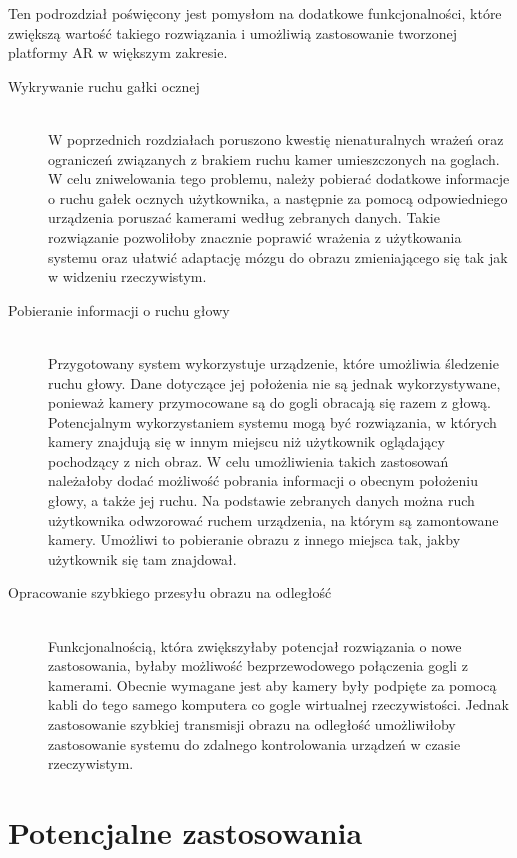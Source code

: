 \documentclass[a4paper,11pt,twoside]{report}
\theoremstyle{definition}
\begin{document}
Ten podrozdział poświęcony jest pomysłom na dodatkowe funkcjonalności, które zwiększą wartość takiego rozwiązania i umożliwią zastosowanie tworzonej platformy AR w większym zakresie.

\begin{description}
\item [Wykrywanie ruchu gałki ocznej] \hfill \\
W poprzednich rozdziałach poruszono kwestię nienaturalnych wrażeń oraz ograniczeń związanych z brakiem ruchu kamer umieszczonych na goglach. W celu zniwelowania tego problemu, należy pobierać dodatkowe informacje o ruchu gałek ocznych użytkownika, a następnie za pomocą odpowiedniego urządzenia poruszać kamerami według zebranych danych. Takie rozwiązanie pozwoliłoby znacznie poprawić wrażenia z użytkowania systemu oraz ułatwić  adaptację mózgu do obrazu zmieniającego się tak jak w widzeniu rzeczywistym.

\item [Pobieranie informacji o ruchu głowy] \hfill \\
Przygotowany system wykorzystuje urządzenie, które umożliwia śledzenie ruchu głowy. Dane dotyczące jej położenia nie są jednak wykorzystywane, ponieważ kamery przymocowane są do gogli obracają się razem z głową. Potencjalnym wykorzystaniem systemu mogą być rozwiązania, w których kamery znajdują się w innym miejscu niż użytkownik oglądający pochodzący z nich obraz. W celu umożliwienia takich zastosowań należałoby dodać możliwość pobrania informacji o obecnym położeniu głowy, a także jej ruchu. Na podstawie zebranych danych można ruch użytkownika odwzorować ruchem urządzenia, na którym są zamontowane kamery. Umożliwi to pobieranie obrazu z innego miejsca tak, jakby użytkownik się tam znajdował.

\item [Opracowanie szybkiego przesyłu obrazu na odległość] \hfill \\
Funkcjonalnością, która zwiększyłaby potencjał rozwiązania o nowe zastosowania, byłaby możliwość bezprzewodowego połączenia gogli z kamerami. Obecnie wymagane jest aby kamery były podpięte za pomocą kabli do tego samego komputera co gogle wirtualnej rzeczywistości. Jednak zastosowanie szybkiej transmisji obrazu na odległość umożliwiłoby zastosowanie systemu do zdalnego kontrolowania urządzeń w czasie rzeczywistym.

\end{description}

\section{Potencjalne zastosowania}
\end{document}
